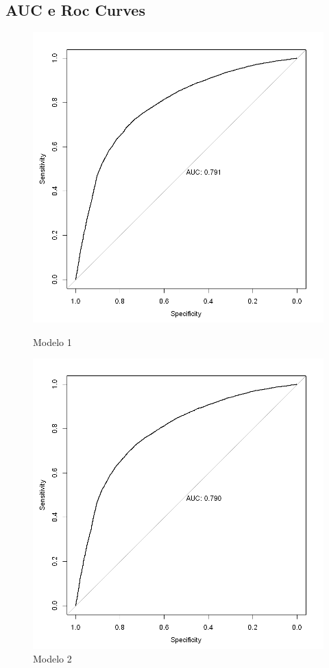 \documentclass[article,11pt,a4paper,brazil]{abntex2}
\begin{document}
	\subsection{AUC e Roc Curves}
	\begin{figure}[H]
		\centering
		\begin{minipage}[b]{0.35\textwidth}
			\includegraphics[width=\textwidth]{Images/roc1.png}
			\caption{Modelo 1}
		\end{minipage}
		\hspace{2mm}
		\begin{minipage}[b]{0.35\textwidth}
			\includegraphics[width=\textwidth]{Images/roc2.png}
			\caption{Modelo 2}
		\end{minipage}
	\end{figure}
\end{document}
